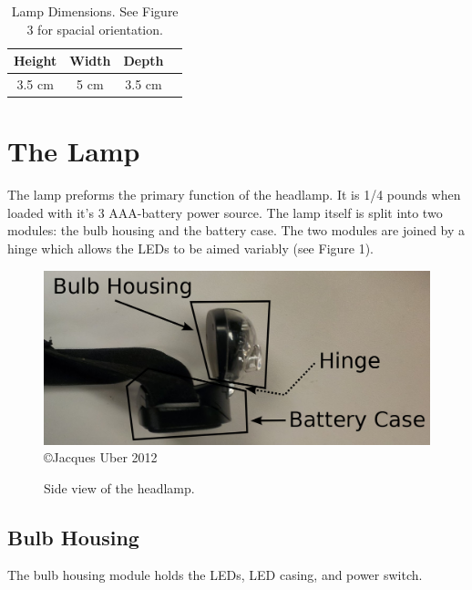 \documentclass[12pt]{article}
\begin{document}
\begin{table}[h!]
\begin{center}
\begin{tabular}{ | c | c | c | p{5cm} |}
    \hline
    Height & Width & Depth \\ \hline
    3.5 cm & 5 cm & 3.5 cm  \\ \hline
\end{tabular}
\end{center}
\caption{Lamp Dimensions. See Figure 3 for spacial orientation.}



\section{The Lamp}
The lamp preforms the primary function of the headlamp. It is 1/4 pounds when loaded with
it's 3 AAA-battery power source. The lamp itself is split into two modules: the bulb housing and the
battery case. The two modules are joined by a hinge which allows the LEDs to be aimed variably (see
Figure 1).

\end{table}
\begin{figure}[h!]
\centering
\caption[Side view of the headlamp] {Side view of the headlamp.}
\includegraphics[width=5in]{headlamp_side}
\\ {\tiny \copyright  Jacques Uber 2012}
\end{figure}

\subsection{Bulb Housing}
The bulb housing module holds the LEDs, LED casing, and power switch.
\end{document}
